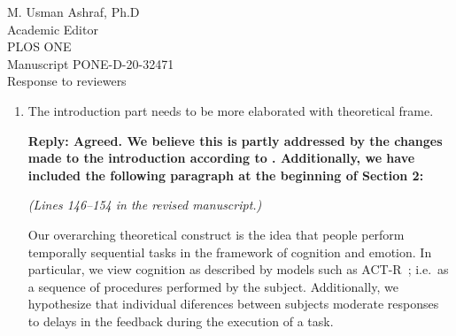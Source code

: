 \documentclass[10pt, letterpaper]{letter}
\newenvironment{QandA}
{\begin{enumerate}[
    label={\bfseries Comment \arabic*:}, 
    wide,
    ref={Comment \arabic*}]}
{\end{enumerate}}
\newenvironment{revised}[2]
{%
\begin{displayquote}
    \medskip
    \begin{flushright}
        \itshape{(Lines \numrange{#1}{#2} in the revised manuscript.)}\normalfont%
    \end{flushright}
    \medskip

}
{\end{displayquote}}
\newenvironment{answered}
{\medskip\par\bfseries Reply: \normalfont}
{\par\noindent\makebox[\linewidth]{\rule{\textwidth}{0.4pt}}\bigskip}
\begin{document}
\begin{letter}{
    M. Usman Ashraf, Ph.D\\
    Academic Editor\\
    PLOS ONE\\
    \medskip
    Manuscript PONE-D-20-32471\\
    Response to reviewers\\
}
\begin{QandA}
\begin{answered}
\begin{revised}{8}{121}
\begin{itemize}
            In line with previous items, we expected delay effects in subjects to be mediated primarily by emotion.
            In particular, we expected emotional effects to be correlated with the strength of the added delay.\\

            The results point in a different direction though, indicating that reduced responsiveness in WCA systems leads to a disruption of participants' cognitive plan for the task and not to an emotional response.
            This is evidenced by the previously discussed pacing effect and the lack of significant physiological responses.\\

            \item \emph{Are these effects mediated by personality indicators in any way?}\\
            
            Finally, we hypothesized that the individual trait of \emph{neuroticism}~\autocite{john1999:bfi} would play a role in mediating these effects, as it has previously been connected to intolerance for time delay~\autocite{hirsh2008delay}.
            We also expected \emph{focus} and \emph{involvement}~\autocite{witmer1998:itq} to play roles in this.\\

            The results obtained agree with our hypothesis. 
            We found significant effects of neuroticism on the responses exhibited by subjects, and all three traits were found to play a role through factor analysis.
            \end{itemize}
        \end{revised}
    \end{answered}

    \item The introduction part needs to be more elaborated with theoretical frame.
    
    \begin{answered}
        Agreed.
        We believe this is partly addressed by the changes made to the introduction according to .
        Additionally, we have included the following paragraph at the beginning of Section 2:
        
        \begin{revised}{146}{154}
            Our overarching theoretical construct is the idea that people perform temporally sequential tasks in the framework of cognition and emotion.
            In particular, we view cognition as described by models such as {ACT-R}~\autocite{neves1981knowledge}; i.e.\ as a sequence of procedures performed by the subject.
            Additionally, we hypothesize that individual diferences between subjects moderate responses to delays in the feedback during the execution of a task.\\


\end{revised}
\end{answered}
\end{QandA}
\end{letter}
\end{document}
